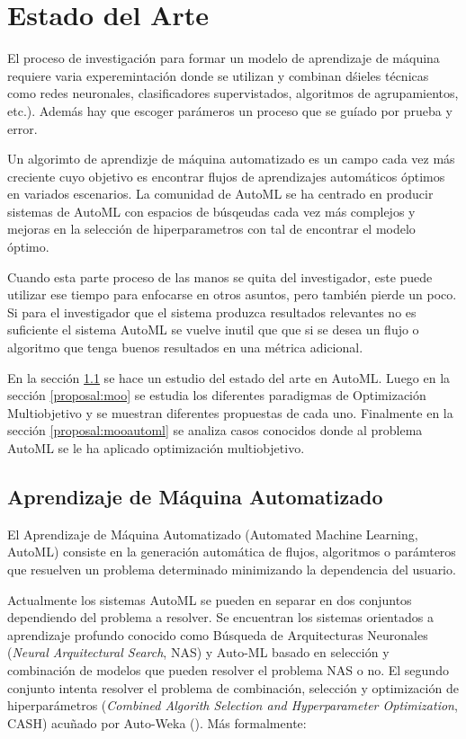 \chapter{Estado del Arte}\label{chapter:state-of-the-art}
El proceso de investigaci\'on para formar un modelo de aprendizaje de m\'aquina requiere varia experemintaci\'on donde se utilizan y combinan d\'sieles t\'ecnicas como redes neuronales, clasificadores supervistados, algoritmos de agrupamientos, etc.). Adem\'as hay que escoger par\'ameros un proceso que se gu\'iado por prueba y error. 

Un algorimto de aprendizje de m\'aquina automatizado es un campo cada vez m\'as creciente cuyo objetivo es encontrar flujos de aprendizajes autom\'aticos \'optimos en variados escenarios. La comunidad de AutoML se ha centrado en producir sistemas de AutoML con espacios de b\'usqeudas cada vez m\'as complejos y mejoras en la selecci\'on de hiperparametros con tal de encontrar el modelo \'optimo.

Cuando esta parte proceso de las manos se quita del investigador, este puede utilizar ese tiempo para enfocarse en otros asuntos, pero tambi\'en pierde un poco. Si para el investigador que el sistema produzca resultados relevantes no es suficiente el sistema AutoML se vuelve inutil que que si se desea un flujo o algoritmo que tenga buenos resultados en una m\'etrica adicional.

En la secci\'on \ref{proposal:automl} se  hace un estudio del estado del arte en AutoML. Luego en la secci\'on \ref{proposal:moo} se estudia los diferentes paradigmas de Optimizaci\'on Multiobjetivo y se muestran diferentes propuestas de cada uno. Finalmente en la secci\'on \ref{proposal:mooautoml} se analiza casos conocidos donde al problema AutoML se le ha aplicado optimizaci\'on multiobjetivo.

\section{Aprendizaje de M\'aquina Automatizado}\label{proposal:automl}
El Aprendizaje de M\'aquina Automatizado (Automated Machine Learning, AutoML) consiste en la generaci\'on autom\'atica de flujos, algoritmos o par\'amteros que resuelven un problema determinado minimizando la dependencia del usuario. 

Actualmente los sistemas AutoML se pueden en separar en dos conjuntos dependiendo del problema a resolver. Se encuentran los sistemas orientados a aprendizaje profundo conocido como B\'usqueda de Arquitecturas Neuronales (\textit{Neural Arquitectural Search}, NAS) y  Auto-ML basado en selecci\'on y combinaci\'on de modelos que pueden resolver el problema NAS o no. El segundo conjunto intenta resolver el problema de combinaci\'on, selecci\'on y optimizaci\'on de hiperpar\'ametros (\textit{Combined Algorith Selection and Hyperparameter Optimization}, CASH) acuñado por Auto-Weka (\cite{thornton2013auto}). M\'as formalmente:


